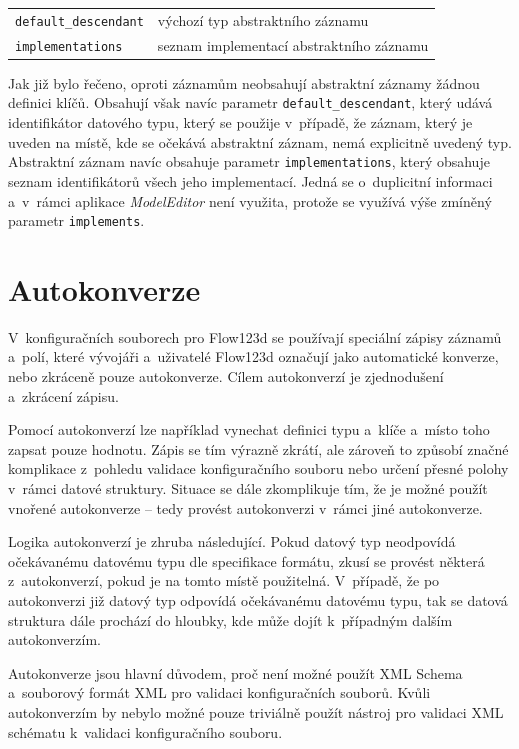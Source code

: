 \documentclass[FM,bw,DP]{tulthesis}
\begin{document}
\vspace{0.5cm}
\begin{tabular}{m{5cm}@{}l}
\texttt{default\_descendant}\dotfill & výchozí typ abstraktního záznamu \\
\texttt{implementations}\dotfill & seznam implementací abstraktního záznamu \\
\end{tabular}
\vspace{0.5cm}

Jak již bylo řečeno, oproti záznamům neobsahují abstraktní záznamy žádnou definici klíčů. Obsahují však navíc parametr \texttt{default\_descendant}, který udává identifikátor datového typu, který se použije v~případě, že záznam, který je uveden na místě, kde se očekává abstraktní záznam, nemá explicitně uvedený typ. Abstraktní záznam navíc obsahuje parametr \texttt{implementations}, který obsahuje seznam identifikátorů všech jeho implementací. Jedná se o~duplicitní informaci a~v~rámci aplikace \textit{ModelEditor} není využita, protože se využívá výše zmíněný parametr \texttt{implements}.


\section{Autokonverze}
\label{sec:analyza-autokonverze}

V~konfiguračních souborech pro Flow123d se používají speciální zápisy záznamů a~polí, které vývojáři a~uživatelé Flow123d označují jako automatické konverze, nebo zkráceně pouze autokonverze. Cílem autokonverzí je zjednodušení a~zkrácení zápisu.

Pomocí autokonverzí lze například vynechat definici typu a~klíče a~místo toho zapsat pouze hodnotu. Zápis se tím výrazně zkrátí, ale zároveň to způsobí značné komplikace z~pohledu validace konfiguračního souboru nebo určení přesné polohy v~rámci datové struktury. Situace se dále zkomplikuje tím, že je možné použít vnořené autokonverze -- tedy provést autokonverzi v~rámci jiné autokonverze.

Logika autokonverzí je zhruba následující. Pokud datový typ neodpovídá o\-če\-ká\-va\-né\-mu datovému typu dle specifikace formátu, zkusí se provést některá z~autokonverzí, pokud je na tomto místě použitelná. V~případě, že po autokonverzi již datový typ odpovídá očekávanému datovému typu, tak se datová struktura dále prochází do hloubky, kde může dojít k~případným dalším autokonverzím.

Autokonverze jsou hlavní důvodem, proč není možné použít \gls{XML} Schema a~souborový formát \gls{XML} pro validaci konfiguračních souborů. Kvůli autokonverzím by nebylo možné pouze triviálně použít nástroj pro validaci \gls{XML} schématu k~validaci konfiguračního souboru.
\end{document}
